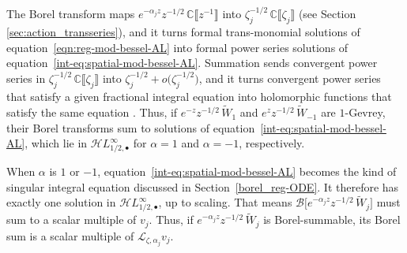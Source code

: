 \documentclass{article}
\newcommand{\singexp}[2]{\mathcal{H}L^\infty_{#1, #2}}
\newcommand{\singexpalg}[1]{\singexp{#1}{\bullet}}
\theoremstyle{definition}
\newcommand{\C}{\mathbb{C}}
\newcommand{\laplace}{\mathcal{L}}
\newcommand{\borel}{\mathcal{B}}
\begin{document}
The Borel transform maps $e^{-\alpha_j z} z^{-1/2}\,\C\llbracket z^{-1} \rrbracket$ into $\zeta_j^{-1/2}\,\C\llbracket \zeta_j \rrbracket$ (see Section \ref{sec:action_transseries}), and it turns formal trans-monomial solutions of equation~\eqref{eqn:reg-mod-bessel-AL} into formal power series solutions of equation~\eqref{int-eq:spatial-mod-bessel-AL}. Summation sends convergent power series in $\zeta_j^{-1/2}\,\C\llbracket \zeta_j \rrbracket$ into $\zeta_j^{-1/2}+ o\big(\zeta_j^{-1/2}\big)$, and it turns convergent power series that satisfy a given fractional integral equation into holomorphic functions that satisfy the same equation \cite[Lemma 2]{reg-sing-volterra}. Thus, if $e^{-z} z^{-1/2}\,\tilde{W}_1$ and $e^z z^{-1/2}\,\tilde{W}_{-1}$ are $1$-Gevrey, their Borel transforms sum to solutions of equation~\eqref{int-eq:spatial-mod-bessel-AL}, which lie in $\singexpalg{1/2}$ for $\alpha = 1$ and $\alpha = -1$, respectively.

When $\alpha$ is $1$ or $-1$, equation~\eqref{int-eq:spatial-mod-bessel-AL} becomes the kind of singular integral equation discussed in Section~\ref{borel_reg-ODE}. It therefore has exactly one solution in $\singexpalg{1/2}$, up to scaling. That means $\borel\big[ e^{-\alpha_j z} z^{-1/2}\,\tilde{W}_j \big]$ must sum to a scalar multiple of $v_j$. Thus, if $e^{-\alpha_j z} z^{-1/2}\,\tilde{W}_j$ is Borel-summable, its Borel sum is a scalar multiple of $\laplace_{\zeta, \alpha_j} v_j$.
\end{document}
